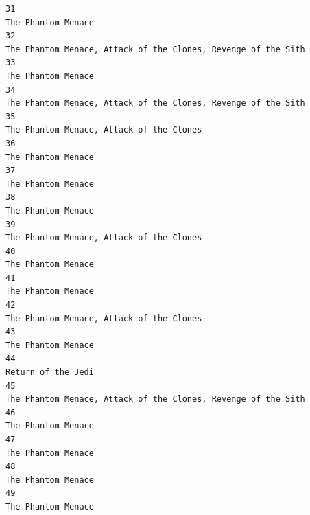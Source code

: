 \documentclass[
]{article}
\begin{document}
\begin{verbatim}
31                                                                                                                        The Phantom Menace
32                                                                             The Phantom Menace, Attack of the Clones, Revenge of the Sith
33                                                                                                                        The Phantom Menace
34                                                                             The Phantom Menace, Attack of the Clones, Revenge of the Sith
35                                                                                                  The Phantom Menace, Attack of the Clones
36                                                                                                                        The Phantom Menace
37                                                                                                                        The Phantom Menace
38                                                                                                                        The Phantom Menace
39                                                                                                  The Phantom Menace, Attack of the Clones
40                                                                                                                        The Phantom Menace
41                                                                                                                        The Phantom Menace
42                                                                                                  The Phantom Menace, Attack of the Clones
43                                                                                                                        The Phantom Menace
44                                                                                                                        Return of the Jedi
45                                                                             The Phantom Menace, Attack of the Clones, Revenge of the Sith
46                                                                                                                        The Phantom Menace
47                                                                                                                        The Phantom Menace
48                                                                                                                        The Phantom Menace
49                                                                                                                        The Phantom Menace

\end{verbatim}
\end{document}
